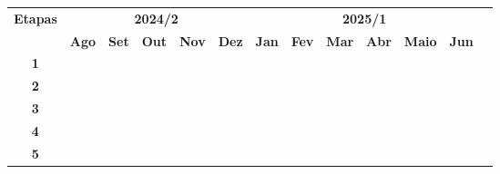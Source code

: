 \documentclass[12pt]{article}
\begin{document}
\vspace{0.5cm}
{
	\noindent \begin{tabular}{|c|c|c|c|c|c|c|c|c|c|c|c|c|}
		\hline
		\multirow{2}{*}{\textbf{\small{Etapas}}} & \multicolumn{5}{|c|}{\textbf{\small{2024/2}}} &
		\multicolumn{6}{|c|}{\textbf{\small{2025/1}}}                                                                                                                                                                                                                         \\
		\cline{2-12}
		                                         & \textbf{Ago}                                  & \textbf{Set}     & \textbf{Out}     & \textbf{Nov}     & \textbf{Dez}     & \textbf{Jan}     &
		\textbf{Fev}                             & \textbf{Mar}                                  & \textbf{Abr}     & \textbf{Maio}    & \textbf{Jun}                                                                                                                         \\
		\hline
		\textbf{\small{1}}                       & \cellcolor{gray}                              & \cellcolor{gray} & \cellcolor{gray} &                  &                  &                  &                  &                  &                  &                  & \\
		\hline
		\textbf{\small{2}}                       &                                               & \cellcolor{gray} & \cellcolor{gray} &                  &                  &                  &                  &                  &                  &                  & \\
		\hline
		\textbf{\small{3}}                       &                                               &                  & \cellcolor{gray} & \cellcolor{gray} & \cellcolor{gray} & \cellcolor{gray} &                  &                  &                  &                  & \\
		\hline
		\textbf{\small{4}}                       &                                               &                  &                  & \cellcolor{gray} & \cellcolor{gray} & \cellcolor{gray} & \cellcolor{gray} & \cellcolor{gray} &                  &                  & \\
		\hline
		\textbf{\small{5}}                       &                                               &                  &                  &                  &                  &                  & \cellcolor{gray} & \cellcolor{gray} & \cellcolor{gray} & \cellcolor{gray} & \\
		\hline
	\end{tabular}
}
\end{document}
